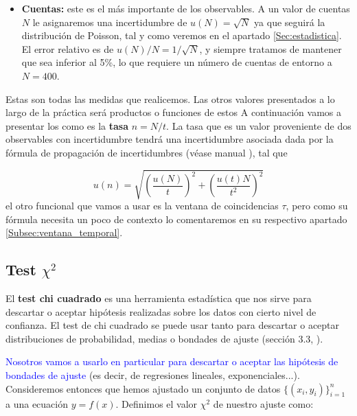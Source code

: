 \documentclass[11pt]{article}
\newcommand{\parentesis}[1]{\left( #1  \right)}
\begin{document}
\begin{itemize}
	

	\item \textbf{Cuentas:} este es el más importante de los observables. A un valor de cuentas $N$ le asignaremos una incertidumbre de $u(N)=\sqrt{N}$ ya que seguirá la distribución de Poisson, tal y como veremos en el apartado \ref{Sec:estadistica}. El error relativo es de $u(N)/N=1/\sqrt{N}$, y siempre tratamos de mantener que sea inferior al 5\%, lo que requiere un número de cuentas de entorno a $N=400$.
\end{itemize}
Estas son todas las medidas que realicemos. Las otros valores presentados a lo largo de la práctica será productos o funciones de estos A continuación vamos a presentar los como es la \textbf{tasa} $n=N/t$. La tasa que es un valor proveniente de dos observables con incertidumbre tendrá una incertidumbre asociada dada por la fórmula de propagación de incertidumbres (véase manual \cite{Estadistica}), tal que

\begin{equation}
	u(n) = \sqrt{\parentesis{\frac{u(N)}{t}}^2 + \parentesis{\frac{u(t)N}{t^2}}^2}
\end{equation}
el otro funcional que vamos a usar es la ventana de coincidencias $\tau$, pero como su fórmula necesita un poco de contexto lo comentaremos en su respectivo apartado \ref{Subsec:ventana_temporal}.

\subsection{Test $\chi^2$} \label{Subsec:chi_cuadrado}

El \textbf{test chi cuadrado} es una herramienta estadística que nos sirve para descartar o aceptar hipótesis realizadas sobre los datos con cierto nivel de confianza. El test de chi cuadrado se puede usar tanto para descartar o aceptar distribuciones de probabilidad, medias o bondades de ajuste (sección 3.3, \cite{Estadistica}). 

\textcolor{blue}{Nosotros vamos a usarlo en particular para descartar o aceptar las hipótesis de bondades de ajuste} (es decir, de regresiones lineales, exponenciales...). Consideremos entonces que hemos ajustado un conjunto de datos $\{  (x_i,y_i)\}_{i=1}^n$ a una ecuación $y=f(x)$. Definimos el valor $\chi^2$ de nuestro ajuste como:
\end{document}
